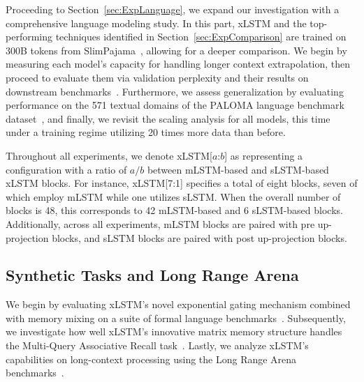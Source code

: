 Proceeding to Section~\ref{sec:ExpLanguage}, 
we expand our investigation with a comprehensive language modeling study. In this part, xLSTM and the top-performing techniques identified in Section~\ref{sec:ExpComparison} are trained on 300B tokens from SlimPajama~\citep{Soboleva:23}, allowing for a deeper comparison. We begin by measuring each model’s capacity for handling longer context extrapolation, then proceed to evaluate them via validation perplexity and their results on downstream benchmarks~\citep{Sutawika:24}. Furthermore, we assess generalization by evaluating performance on the 571 textual domains of the PALOMA language benchmark dataset~\citep{Magnusson:23arxivshort}, and finally, we revisit the scaling analysis for all models, this time under a training regime utilizing 20 times more data than before.

\label{sec:xlstm_blocks_notation}
Throughout all experiments, we denote xLSTM[$a$:$b$] as representing a configuration with a ratio of $a/b$ between mLSTM-based and sLSTM-based xLSTM blocks. For instance, xLSTM[7:1] specifies a total of eight blocks, seven of which employ mLSTM while one utilizes sLSTM. When the overall number of blocks is 48, this corresponds to 42 mLSTM-based and 6 sLSTM-based blocks. Additionally, across all experiments, mLSTM blocks are paired with pre up-projection blocks, and sLSTM blocks are paired with post up-projection blocks.

\subsection{Synthetic Tasks and Long Range Arena}
\label{sec:ExpSyntethic}
We begin by evaluating xLSTM's novel exponential gating mechanism combined with memory mixing on a suite of formal language benchmarks~\citep{Deletang:23}. Subsequently, we investigate how well xLSTM's innovative matrix memory structure handles the Multi-Query Associative Recall task~\citep{Arora:23arxiv}. Lastly, we analyze xLSTM's capabilities on long-context processing using the Long Range Arena benchmarks~\citep{Tay:21}.

